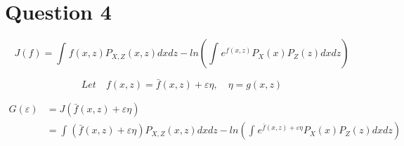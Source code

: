 \documentclass[UTF8]{article}
\begin{document}
% 






\section*{Question 4}
\label{sec_q4}
\begin{equation}
J(f)=\int_{}^{}f(x,z)P_{X,Z}(x,z)dxdz - ln(\int_{}^{}e^{f(x,z)}P_X(x)P_Z(z)dxdz)
\end{equation}

\begin{equation}
Let \quad f(x,z) = \bar{f}(x,z)+\varepsilon\eta, \quad \eta=g(x,z)
\end{equation}

\begin{equation}
\begin{split}
G(\varepsilon) & = J(\bar{f}(x,z)+\varepsilon \eta ) \\
    & =\int_{}^{} ( \bar{f}(x,z)+\varepsilon \eta ) P_{X,Z}(x,z)dxdz - ln(\int_{}^{}e^{\bar{f}(x,z)+\varepsilon \eta}P_X(x)P_Z(z)dxdz)
\end{split}
\end{equation}
\end{document}
